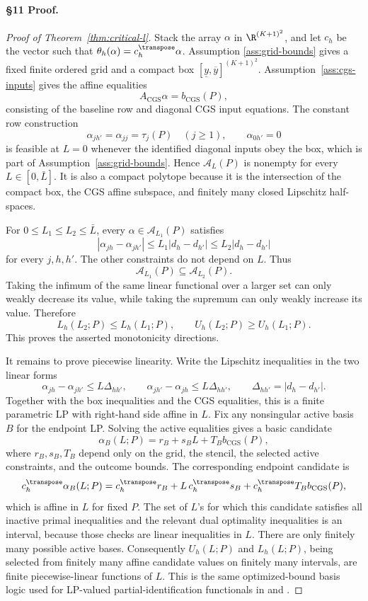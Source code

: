 \paragraph{\S11 Proof.}
\begin{proof}[Proof of Theorem~\ref{thm:critical-l}]
Stack the array \(\alpha\) in \(\R^{(K+1)^2}\), and let \(c_h\) be the vector
such that \(\theta_h(\alpha)=c_h^\transpose\alpha\).  Assumption
\ref{ass:grid-bounds} gives a fixed finite ordered grid and a compact box
\([\underline y,\overline y]^{(K+1)^2}\).  Assumption~\ref{ass:cgs-inputs}
gives the affine equalities
\[
  A_{\mathrm{CGS}}\alpha=b_{\mathrm{CGS}}(P),
\]
consisting of the baseline row and diagonal CGS input equations.  The constant
row construction
\[
  \alpha_{j h'}=\alpha_{j j}=\tau_j(P)\quad(j\ge1),\qquad
  \alpha_{0 h'}=0
\]
is feasible at \(L=0\) whenever the identified diagonal inputs obey the box,
which is part of Assumption~\ref{ass:grid-bounds}.  Hence
\(\mathcal A_L(P)\) is nonempty for every \(L\in[0,\bar L]\).  It is also a
compact polytope because it is the intersection of the compact box, the CGS
affine subspace, and finitely many closed Lipschitz half-spaces.

For \(0\le L_1\le L_2\le\bar L\), every \(\alpha\in\mathcal A_{L_1}(P)\)
satisfies
\[
  |\alpha_{j h}-\alpha_{j h'}|
  \le L_1|d_h-d_{h'}|
  \le L_2|d_h-d_{h'}|
\]
for every \(j,h,h'\).  The other constraints do not depend on \(L\).  Thus
\[
  \mathcal A_{L_1}(P)\subseteq\mathcal A_{L_2}(P).
\]
Taking the infimum of the same linear functional over a larger set can only
weakly decrease its value, while taking the supremum can only weakly increase
its value.  Therefore
\[
  L_h(L_2;P)\le L_h(L_1;P),
  \qquad
  U_h(L_2;P)\ge U_h(L_1;P).
\]
This proves the asserted monotonicity directions.

It remains to prove piecewise linearity.  Write the Lipschitz inequalities in
the two linear forms
\[
  \alpha_{j h}-\alpha_{j h'}\le L\Delta_{hh'},
  \qquad
  \alpha_{j h'}-\alpha_{j h}\le L\Delta_{hh'},
  \qquad
  \Delta_{hh'}=|d_h-d_{h'}|.
\]
Together with the box inequalities and the CGS equalities, this is a finite
parametric LP with right-hand side affine in \(L\).  Fix any nonsingular active
basis \(B\) for the endpoint LP.  Solving the active equalities gives a basic
candidate
\[
  \alpha_B(L;P)=r_B+s_B L+T_B b_{\mathrm{CGS}}(P),
\]
where \(r_B,s_B,T_B\) depend only on the grid, the stencil, the selected active
constraints, and the outcome bounds.  The corresponding endpoint candidate is
\[
  c_h^\transpose\alpha_B(L;P)
  =c_h^\transpose r_B+L\,c_h^\transpose s_B
   +c_h^\transpose T_B b_{\mathrm{CGS}}(P),
\]
which is affine in \(L\) for fixed \(P\).  The set of \(L\)'s for which this
candidate satisfies all inactive primal inequalities and the relevant dual
optimality inequalities is an interval, because those checks are linear
inequalities in \(L\).  There are only finitely many possible active bases.
Consequently \(U_h(L;P)\) and \(L_h(L;P)\), being selected from finitely many
affine candidate values on finitely many intervals, are finite piecewise-linear
functions of \(L\).  This is the same optimized-bound basis logic used for
LP-valued partial-identification functionals in \cite{ChernozhukovLeeRosen2013}
and \cite{Voronin2025}.


\end{proof}
